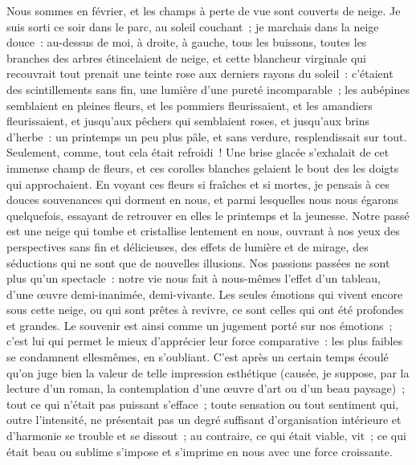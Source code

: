 \documentclass[french,twoside]{book} %
\begin{document}
Nous sommes en février, et les champs à perte de vue sont couverts de neige. Je suis sorti ce soir dans le parc, au soleil couchant ; je marchais dans la neige douce : au-dessus de moi, à droite, à gauche, tous les buissons, toutes les branches des arbres étincelaient de neige, et cette blancheur virginale qui recouvrait tout prenait une teinte rose aux derniers rayons du soleil : c’étaient des scintillements sans fin, une lumière d’une pureté incomparable ; les aubépines semblaient en pleines fleurs, et les pommiers fleurissaient, et les amandiers fleurissaient, et jusqu’aux pêchers qui semblaient roses, et jusqu’aux brins d’herbe : un printemps un peu plus pâle, et sans verdure, resplendissait sur tout. Seulement, comme, tout cela était refroidi ! Une brise glacée s’exhalait de cet immense champ de fleurs, et ces corolles blanches gelaient le bout des les doigts qui approchaient. En voyant ces fleurs si fraîches et si mortes, je pensais à ces douces souvenances qui dorment en nous, et parmi lesquelles nous nous égarons quelquefois, essayant de retrouver en elles le printemps et la jeunesse. Notre passé est une neige qui tombe et cristallise lentement en nous, ouvrant à nos yeux des perspectives sans fin et délicieuses, des effets de lumière et de mirage, des séductions qui ne sont que de nouvelles illusions. Nos passions passées ne sont plus qu’un spectacle : notre vie nous fait à nous-mêmes l’effet d’un tableau, d’une œuvre demi-inanimée, demi-vivante. Les seules émotions qui vivent encore sous cette neige, ou qui sont prêtes à revivre, ce sont celles qui ont été profondes et grandes. Le souvenir est ainsi comme un jugement porté sur nos émotions ; c’est lui qui permet le mieux d’apprécier leur force comparative : les plus faibles se condamnent ellesmêmes, en s’oubliant. C’est après un certain temps écoulé qu’on juge bien la valeur de telle impression esthétique (causée, je suppose, par la lecture d’un roman, la contemplation d’une œuvre d’art ou d’un beau paysage) ; tout ce qui n’était pas puissant s’efface ; toute sensation ou tout sentiment qui, outre l’intensité, ne présentait pas un degré suffisant d’organisation intérieure et d’harmonie se trouble et se dissout ; au contraire, ce qui était viable, vit ; ce qui était beau ou sublime s’impose et s’imprime en nous avec une force croissante.\par
\end{document}
